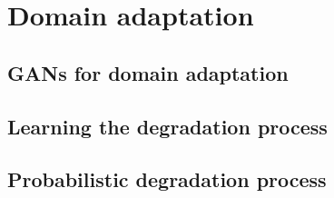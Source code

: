 \section{Domain adaptation} \label{sec:domain_adaptation}
    \subsection{GANs for domain adaptation}

    \subsection{Learning the degradation process}

    \subsection{Probabilistic degradation process}


\clearpage